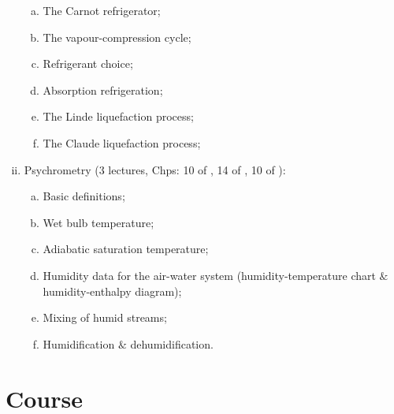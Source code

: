 \documentclass[11pt,oneside,a4paper]{article}
\begin{document}
\begin{enumerate}[(i)]
\begin{enumerate}[(a)]
\item The Carnot refrigerator; 
\item The vapour-compression cycle; 
\item Refrigerant choice; 
\item Absorption refrigeration; 
\item The Linde liquefaction process; 
\item The Claude liquefaction process;
\end{enumerate}
%
\item Psychrometry (3 lectures, Chps: 10 of \cite{muller_2009}, 14 of \cite{cengel_2010}, 10 of \cite{rajput_2007}): 
\begin{enumerate}[(a)]
\item Basic definitions; 
\item Wet bulb temperature; 
\item Adiabatic saturation temperature; 
\item Humidity data for the air-water system (humidity-temperature chart $\&$ humidity-enthalpy diagram); 
\item Mixing of humid streams; 
\item Humidification $\&$ dehumidification.
\end{enumerate}

\end{enumerate}
\clearpage

\section{Course}
\end{document}
